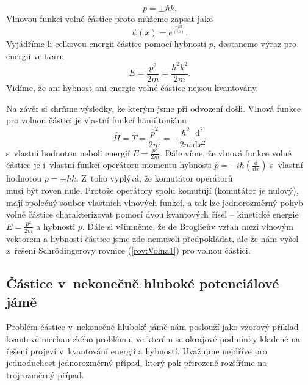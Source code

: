 \begin{equation}
p = \pm \hbar k \mbox{.}
\label{rov:Volna9}
\end{equation}
Vlnovou funkci volné částice proto můžeme zapsat jako
\begin{equation}
\boxed{\psi(x) = e^{\frac{-px}{(i\hbar)}} \mbox{.}}
\label{rov:Volna10}
\end{equation}
Vyjádříme-li celkovou energii částice pomocí hybnosti $p$, dostaneme výraz pro energii ve tvaru
\begin{equation}
\boxed{E = \frac{p^2}{2m} = \frac{\hbar^2k^2}{2m} \mbox{.}}
\label{rov:Volna11}
\end{equation}
Vidíme, že ani hybnost ani energie volné částice nejsou kvantovány.

Na závěr si shrňme výsledky, ke kterým jsme při odvození došli. Vlnová funkce pro volnou částici je vlastní funkcí hamiltoniánu
\begin{equation}
\hat{H} = \hat{T} = \frac{\hat{p}^2}{2m} = -\frac{\hbar^2}{2m}\frac{\mathrm{d}^2}{\mathrm{d}x^2}
\label{rov:Volna12}
\end{equation}
s~vlastní hodnotou neboli energií $E = \frac{p^2}{2m}$. Dále víme, že vlnová funkce volné částice je i~vlastní funkcí operátoru momentu hybnosti $\hat{p} = -i\hbar (\frac{\mathrm{d}}{\mathrm{d}x})$ s~vlastní hodnotou $p = \pm \hbar k$. Z~toho vyplývá, že komutátor operátorů
\begin{equation}
[\hat{T},\hat{p}]
\label{rov:Volna13}
\end{equation}
musí být roven nule. Protože operátory spolu komutují (komutátor je nulový), mají společný soubor vlastních vlnových funkcí, a tak lze jednorozměrný pohyb volné částice charakterizovat pomocí dvou kvantových čísel -- kinetické energie $E = \frac{p^2}{2m}$ a hybnosti $p$. Dále si všimněme, že de Broglieův vztah mezi vlnovým vektorem a hybností částice jsme zde nemuseli předpokládat, ale že nám vyšel z~řešení Schrödingerovy rovnice (\ref{rov:Volna1}) pro volnou částici.

\subsection{Částice v~nekonečně hluboké potenciálové jámě}
\label{kap:CasticeJama}

Problém částice v~nekonečně hluboké jámě nám poslouží jako vzorový příklad kvantově-mechanického problému, ve kterém se okrajové podmínky kladené na řešení projeví v~kvantování energií a hybností. Uvažujme nejdříve pro jednoduchost jednorozměrný případ, který pak přirozeně rozšíříme na trojrozměrný případ.

